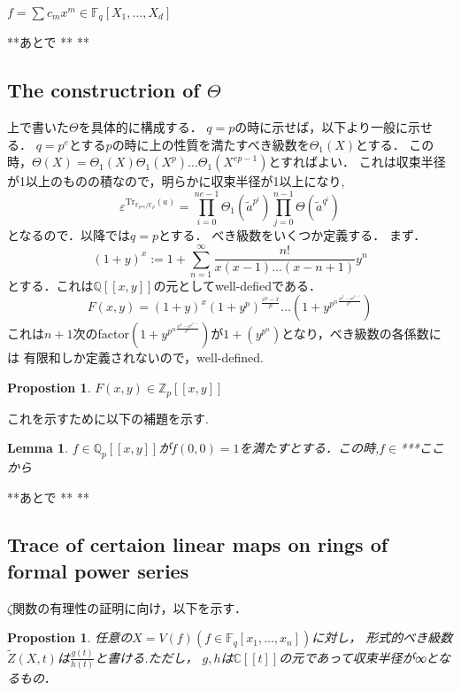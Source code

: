 \documentclass{ujarticle}
\newtheorem{prop}[thm]{Propostion}
\newtheorem{lem}[thm]{Lemma}
\begin{document}
$f=\sum c_mx^m \in \mathbb{F}_q[X_1,\dots,X_d]$

**あとで
**
**

\subsection{The constructrion of $\Theta$}
\label{sub:The constructrion of }
上で書いた$\Theta$を具体的に構成する．
$q=p$の時に示せば，以下より一般に示せる．
$q=p^e$とする$p$の時に上の性質を満たすべき級数を$\Theta_1(X)$とする．
この時，$\Theta(X)=\Theta_1(X)\Theta_1(X^p)\dots\Theta_1(X^{ep-1})$とすればよい．
これは収束半径が1以上のものの積なので，明らかに収束半径が1以上になり,
\begin{equation*}
 \varepsilon^{\mathrm{Tr}_{\mathbb{F}_{p^ne}/\mathbb{F}_p}(a)}=\prod_{i=0}^{ne-1} \Theta_1(\tilde{a}^{p^i})
  \prod_{j=0}^{n-1}\Theta(\tilde{a}^{q^i})
\end{equation*}
となるので．以降では$q=p$とする．
べき級数をいくつか定義する．
まず．
\begin{equation*}
 (1+y)^x:=1+\sum_{n=1}^{\infty}\frac{n!}{x(x-1)\dots(x-n+1)}y^n
\end{equation*}
とする．これは$\mathbb{Q}[[x,y]]$の元としてwell-defiedである．
\begin{equation*}
 F(x,y)=(1+y)^x(1+y^p)^{\frac{x^p-x}{p}}\dots(1+y^{p^n}^{\frac{x^{p^n}-x^{p^{n-1}}}{p^n}})
\end{equation*}
これは$n+1$次のfactor$(1+y^{p^n}^{\frac{x^{p^n}-x^{p^{n-1}}}{p^n}})$が$1+(y^{p^n})$となり，べき級数の各係数には
有限和しか定義されないので，well-defined.
\begin{prop}
 $F(x,y)\in \mathbb{Z}_p[[x,y]]$
\end{prop}
これを示すために以下の補題を示す.

\begin{lem}
 $f \in \mathbb{Q}_p[[x,y]]$が$f(0,0)=1$を満たすとする．この時,$f \in $***ここから
\end{lem}
**あとで
**
**

\subsection{Trace of certaion linear maps on rings of formal power series}
\label{sub:Trace of certaion linear maps on rings of formal power series}

$\zeta$関数の有理性の証明に向け，以下を示す．

\begin{prop}
 任意の$X=V(f)(f \in \mathbb{F}_q[x_1,\dots,x_n]) $に対し，
 形式的べき級数$\tilde{Z}(X,t)$は$\frac{g(t)}{h(t)}$と書ける.ただし，
 $g,h$は$\mathbb{C}[[t]]$の元であって収束半径が∞となるもの．
\end{prop}
\end{document}
